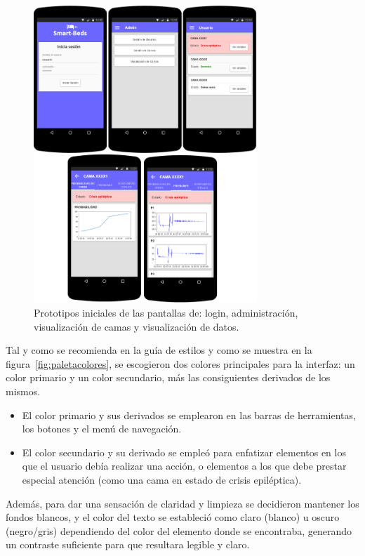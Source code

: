 \begin{figure}[H]
	\centering
	\includegraphics[width=0.75\textwidth]{../img/prototipos.png}
	\caption{Prototipos iniciales de las pantallas de: login, administración, visualización de camas y visualización de datos.}
	\label{fig:prototipos}
\end{figure}

Tal y como se recomienda en la guía de estilos y como se muestra en la figura~\ref{fig:paletacolores}, se escogieron dos colores principales para la interfaz: un color primario y un color secundario, más las consiguientes derivados de los mismos. 
\begin{itemize}
	\item El color primario y sus derivados se emplearon en las barras de herramientas, los botones y el menú de navegación. 
	\item El color secundario y su derivado se empleó para enfatizar elementos en los que el usuario debía realizar una acción, o elementos a los que debe prestar especial atención (como una cama en estado de crisis epiléptica). 
\end{itemize}

Además, para dar una sensación de claridad y limpieza se decidieron mantener los fondos blancos, y el color del texto se estableció como claro (blanco) u oscuro (negro/gris) dependiendo del color del elemento donde se encontraba, generando un contraste suficiente para que resultara legible y claro. 

